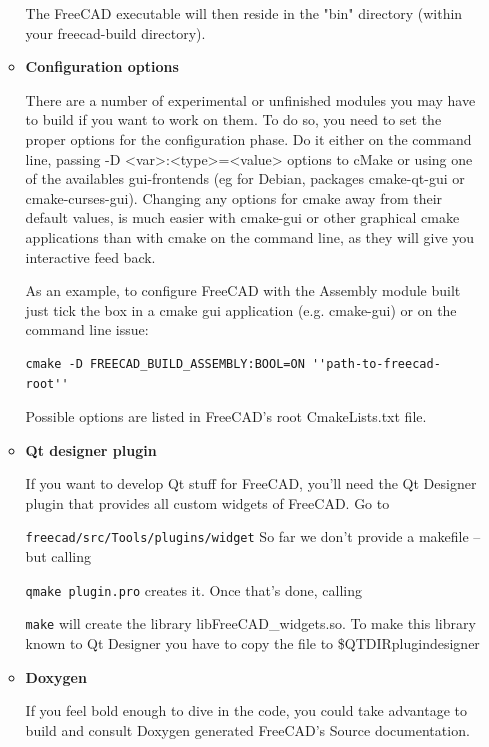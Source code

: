 \begin{itemize}
\begin{itemize}
The FreeCAD executable will then reside in the "bin" directory (within your freecad-build directory).

\item
\textbf{Configuration options}

There are a number of experimental or unfinished modules you may have to build if you want to work on them. To do so, you need to set the proper options for the configuration phase. Do it either on the command line, passing -D <var>:<type>=<value> options to cMake or using one of the availables gui-frontends (eg for Debian, packages cmake-qt-gui or cmake-curses-gui). Changing any options for cmake away from their default values, is much easier with cmake-gui or other graphical cmake applications than with cmake on the command line, as they will give you interactive feed back.

As an example, to configure FreeCAD with the Assembly module built just tick the box in a cmake gui application (e.g. cmake-gui) or on the command line issue:

\begin{verbatim}
cmake -D FREECAD_BUILD_ASSEMBLY:BOOL=ON ''path-to-freecad-root''
\end{verbatim}

Possible options are listed in FreeCAD's root CmakeLists.txt file.

\item
\textbf{Qt designer plugin}

If you want to develop Qt stuff for FreeCAD, you'll need the Qt Designer plugin that provides all custom widgets of FreeCAD. Go to

\texttt{freecad/src/Tools/plugins/widget}
So far we don't provide a makefile -- but calling

\texttt{qmake plugin.pro}
creates it. Once that's done, calling

\texttt{make}
will create the library libFreeCAD\_widgets.so. To make this library known to Qt Designer you have to copy the file to \$QTDIR\/plugin\/designer

\item
\textbf{Doxygen}

If you feel bold enough to dive in the code, you could take advantage to build and consult Doxygen generated FreeCAD's Source documentation.


\end{itemize}
\end{itemize}

